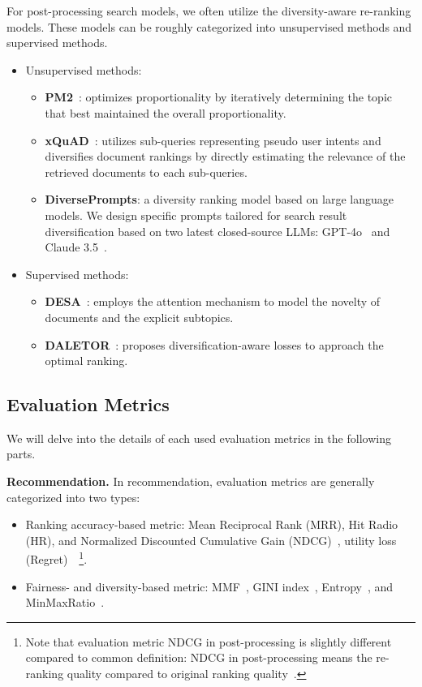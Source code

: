 \noindent%
For post-processing search models, we often utilize the diversity-aware re-ranking models. These models can be roughly categorized into unsupervised methods and supervised methods. 

\begin{itemize}[leftmargin=*]
    \item Unsupervised methods:
    \begin{itemize}[leftmargin=*]
        \item  \textbf{PM2}~\cite{PM2_12_sigir}: optimizes proportionality by iteratively determining the topic that best maintained the overall proportionality. 
        \item \textbf{xQuAD}~\cite{xQuAD_10_www}: utilizes sub-queries representing pseudo user intents and diversifies document rankings by directly estimating the relevance of the retrieved documents to each sub-queries. 
        \item \textbf{DiversePrompts}: a diversity ranking model based on large language models. We design specific prompts tailored for search result diversification based on two latest closed-source LLMs: GPT-4o~\cite{openai2024gpt4technicalreport} and Claude 3.5~\cite{Claude3.5}.
    \end{itemize}
    \item Supervised methods: 
    \begin{itemize}[leftmargin=*]
        \item \textbf{DESA}~\cite{DESA_20_cikm}: employs the attention mechanism to model the novelty of documents and the explicit subtopics. 
        \item \textbf{DALETOR}~\cite{DALETOR_21_WWW}: proposes diversification-aware losses to approach the optimal ranking. 
    \end{itemize}
\end{itemize}




\subsection{Evaluation Metrics}\label{sec:evaluation}
We will delve into the details of each used evaluation metrics in the following parts.

\noindent\textbf{Recommendation.} In recommendation, evaluation metrics are generally categorized into two types: 
\begin{itemize}[leftmargin=*]
    \item Ranking accuracy-based metric: Mean Reciprocal Rank (MRR), Hit Radio (HR), and Normalized Discounted Cumulative Gain (NDCG)~\cite{IRbook}, utility loss (\ie Regret)~\cite{xu2023p}~\footnote{Note that evaluation metric NDCG in post-processing is slightly different compared to common definition: NDCG in post-processing means the re-ranking quality compared to original ranking quality~\cite{xu2023p}.}.
    \item Fairness- and diversity-based metric:  MMF~\cite{xu2023p}, GINI index~\cite{nips21welf}, Entropy~\cite{jost2006entropy}, and MinMaxRatio~\cite{rehman2018selection}.
\end{itemize}

